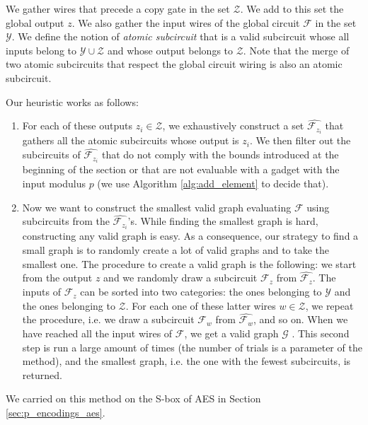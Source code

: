 We gather wires that precede a copy gate in the set $\mathcal{Z}$. We add to this set the global output $z$. We also gather the input wires of the global circuit $\mathcal{F}$ in the set $\mathcal{Y}$. We define the notion of \textit{atomic subcircuit} that is a valid subcircuit whose all inputs belong to $\mathcal{Y} \cup \mathcal{Z}$ and whose output belongs to $\mathcal{Z}$. Note that the merge of two atomic subcircuits that respect the global circuit wiring is also an atomic subcircuit.

\medskip

Our heuristic works as follows:

\begin{enumerate}
    \item For each of these outputs $z_i \in \mathcal{Z}$, we exhaustively construct a set $\widehat{\mathcal{F}_{z_{i}}}$ that gathers all the atomic subcircuits whose output is $z_i$.
    We then filter out the subcircuits of $\widehat{\mathcal{F}_{z_{i}}}$ that do not comply with the bounds introduced at the beginning of the section or that are not evaluable with a gadget with the input modulus $p$ (we use Algorithm \ref{alg:add_element} to decide that).
    \medskip
    \item Now we want to construct the smallest valid graph evaluating $\mathcal{F}$ using subcircuits from the $\widehat{\mathcal{F}_{z_{i}}}$'s. While finding the smallest graph is hard, constructing any valid graph is easy. As a consequence, our strategy to find a small graph is to randomly create a lot of valid graphs and to take the smallest one. The procedure to create a valid graph is the following: we start from the output $z$ and we randomly draw a subcircuit $\mathcal{F}_z$ from $\widehat{\mathcal{F}_z}$. The inputs of $\mathcal{F}_z$ can be sorted into two categories: the ones belonging to $\mathcal{Y}$ and the ones belonging to $\mathcal{Z}$. For each one of these latter wires $w \in \mathcal{Z}$, we repeat the procedure, i.e. we draw a subcircuit $\mathcal{F}_w$ from $\widehat{\mathcal{F}_w}$, and so on. When we have reached all the input wires of $\mathcal{F}$, we get a valid graph $\mathcal{G}$ . This second step is run a large amount of times (the number of trials is a parameter of the method), and the smallest graph, i.e. the one with the fewest subcircuits, is returned.
\end{enumerate}

We carried on this method on the \gls{S-box} of \gls{AES} in Section \ref{sec:p_encodings_aes}.


